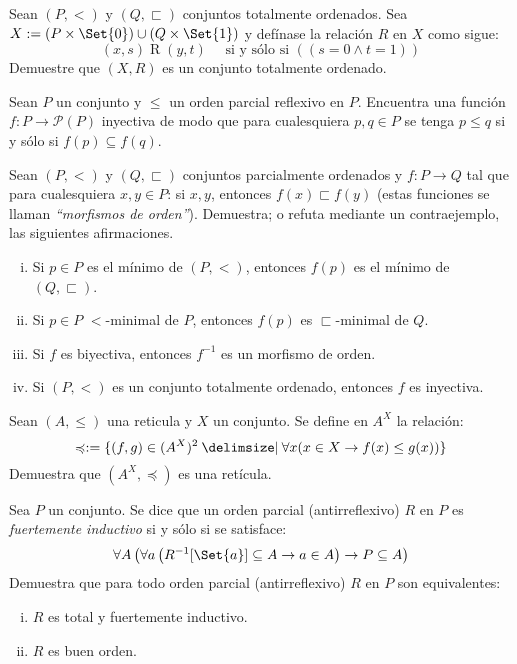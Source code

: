 \begin{exercise}[parzfc=2]
  Sean $(P,<)$ y $(Q,\sqsubset)$ conjuntos totalmente ordenados. Sea $X:=(P \times \Set{0}) \cup (Q \times \Set{1})$ y defínase la relación $R$ en $X$ como sigue:
  \[ (x,s) \mathrel{R} (y,t) \quad \text{ si y sólo si } \left( \left( s=0 \land t =1 \right) \right) \]
  Demuestre que $(X,R)$ es un conjunto totalmente ordenado.
\end{exercise}

\begin{exercise}[parzfc=2]
  Sean $P$ un conjunto y $\leq$ un orden parcial reflexivo en $P$. Encuentra una función $f:P \to \mathscr{P}(P)$ inyectiva de modo que para cualesquiera $p,q\in P$ se tenga $p \leq q$ si y sólo si $f(p) \subseteq f(q)$.
\end{exercise}

\begin{exercise}[parzfc=2]
  Sean $(P,<)$ y $(Q,\sqsubset)$ conjuntos parcialmente ordenados y $f:P \to Q$ tal que para cualesquiera $x,y \in P$: si $x , y$, entonces $f(x) \sqsubset f(y)$ (estas funciones se llaman \textit{``morfismos de orden''}). Demuestra; o refuta mediante un contraejemplo, las siguientes afirmaciones.
  \begin{enumerate}[i)]
    \item Si $p \in P$ es el mínimo de $(P,<)$, entonces $f(p)$ es el mínimo de $(Q,\sqsubset)$.
    \item Si $p \in P$ $<$-minimal de $P$, entonces $f(p)$ es $\sqsubset$-minimal de $Q$.
    \item Si $f$ es biyectiva, entonces $f^{-1}$ es un morfismo de orden.
    \item Si $(P,<)$ es un conjunto totalmente ordenado, entonces $f$ es inyectiva.
  \end{enumerate}
\end{exercise}

\begin{exercise}[parzfc=2]
  Sean $(A,\leq)$ una reticula y $X$ un conjunto. Se define en $A^X$ la relación:
  \[\preccurlyeq :=\set{(f,g)\in (A^X)^2 \st \forall x(x\in X \rightarrow f(x)\leq g(x))}\]
  Demuestra que $(A^X,\preccurlyeq)$ es una retícula.
\end{exercise}

\begin{exercise}[parzfc=2]
  Sea $P$ un conjunto. Se dice que un orden parcial (antirreflexivo) $R$ en $P$ es \textit{fuertemente inductivo} si y sólo si se satisface:
  \[ \forall A \left( \forall a \left( R^{-1}[\Set{a}] \subseteq A \rightarrow a \in A \right) \rightarrow P \subseteq A \right) \]
  Demuestra que para todo orden parcial (antirreflexivo) $R$ en $P$ son equivalentes:
  \begin{enumerate}[i)]
    \item $R$ es total y fuertemente inductivo.
    \item $R$ es buen orden.
  \end{enumerate}
\end{exercise}